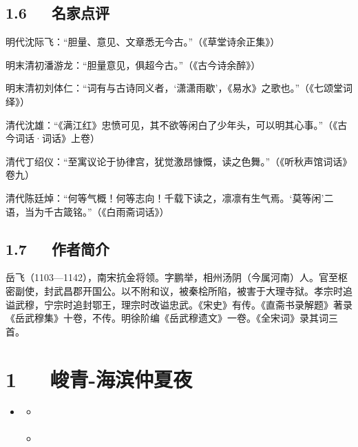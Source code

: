 \documentclass[letterpaper,10pt,english]{sphinxmanual}
\begin{document}
\section{1.6   名家点评}
\label{\detokenize{p01_u6563_u6587/_u5cb3_u98de-_u6ee1_u6c5f_u7ea2_xb7_u6012_u53d1_u51b2_u51a0:id8}}
明代沈际飞：“胆量、意见、文章悉无今古。”（《草堂诗余正集》）

明末清初潘游龙：“胆量意见，俱超今古。”（《古今诗余醉》）

明末清初刘体仁：“词有与古诗同义者，‘潇潇雨歇’，《易水》之歌也。”（《七颂堂词绎》）

清代沈雄：“《满江红》忠愤可见，其不欲等闲白了少年头，可以明其心事。”（《古今词话·词话》上卷）

清代丁绍仪：“至寓议论于协律宫，犹觉激昂慷慨，读之色舞。”（《听秋声馆词话》卷九）

清代陈廷焯：“何等气概！何等志向！千载下读之，凛凛有生气焉。‘莫等闲’二语，当为千古箴铭。”（《白雨斋词话》）


\section{1.7   作者简介}
\label{\detokenize{p01_u6563_u6587/_u5cb3_u98de-_u6ee1_u6c5f_u7ea2_xb7_u6012_u53d1_u51b2_u51a0:id9}}
岳飞（1103—1142），南宋抗金将领。字鹏举，相州汤阴（今属河南）人。官至枢密副使，封武昌郡开国公。以不附和议，被秦桧所陷，被害于大理寺狱。孝宗时追谥武穆，宁宗时追封鄂王，理宗时改谥忠武。《宋史》有传。《直斋书录解题》著录《岳武穆集》十卷，不传。明徐阶编《岳武穆遗文》一卷。《全宋词》录其词三首。


\chapter{1   峻青-海滨仲夏夜}
\label{\detokenize{p01_u6563_u6587/_u5cfb_u9752-_u6d77_u6ee8_u4ef2_u590f_u591c:id1}}\label{\detokenize{p01_u6563_u6587/_u5cfb_u9752-_u6d77_u6ee8_u4ef2_u590f_u591c::doc}}
\begin{sphinxShadowBox}
\begin{itemize}
\item {} 
\label{\detokenize{p01_u6563_u6587/_u5cfb_u9752-_u6d77_u6ee8_u4ef2_u590f_u591c:id5}}{\hyperref[\detokenize{p01_u6563_u6587/_u5cfb_u9752-_u6d77_u6ee8_u4ef2_u590f_u591c:id1}]{}}
\begin{itemize}
\item {} 
\label{\detokenize{p01_u6563_u6587/_u5cfb_u9752-_u6d77_u6ee8_u4ef2_u590f_u591c:id6}}{\hyperref[\detokenize{p01_u6563_u6587/_u5cfb_u9752-_u6d77_u6ee8_u4ef2_u590f_u591c:id3}]{}}

\item {} 
\label{\detokenize{p01_u6563_u6587/_u5cfb_u9752-_u6d77_u6ee8_u4ef2_u590f_u591c:id7}}{\hyperref[\detokenize{p01_u6563_u6587/_u5cfb_u9752-_u6d77_u6ee8_u4ef2_u590f_u591c:id4}]{}}

\end{itemize}

\end{itemize}
\end{sphinxShadowBox}
\end{document}
